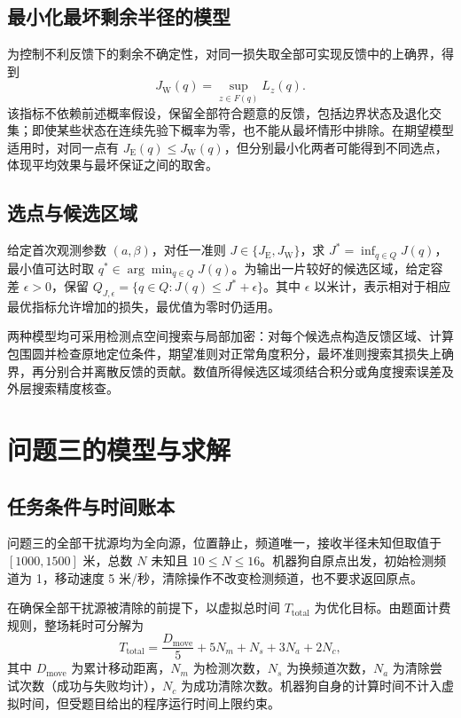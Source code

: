 \documentclass[UTF8,a4paper,zihao=-4,fontset=none]{ctexart}
\begin{document}
\subsection{最小化最坏剩余半径的模型}

为控制不利反馈下的剩余不确定性，对同一损失取全部可实现反馈中的上确界，得到
\begin{equation}
 J_{\mathrm W}(q)=\sup_{z\in F(q)}L_z(q).
\label{eq:q2-pair-worst-objective}
\end{equation}
该指标不依赖前述概率假设，保留全部符合题意的反馈，包括边界状态及退化交集；即使某些状态在连续先验下概率为零，也不能从最坏情形中排除。在期望模型适用时，对同一点有 \(J_{\mathrm E}(q)\le J_{\mathrm W}(q)\)，但分别最小化两者可能得到不同选点，体现平均效果与最坏保证之间的取舍。

\subsection{选点与候选区域}

给定首次观测参数 \((a,\beta)\)，对任一准则 \(J\in\{J_{\mathrm E},J_{\mathrm W}\}\)，求 \(J^*=\inf_{q\in Q}J(q)\)，最小值可达时取 \(q^*\in\arg\min_{q\in Q}J(q)\)。为输出一片较好的候选区域，给定容差 \(\epsilon>0\)，保留 \(Q_{J,\epsilon}=\{q\in Q:J(q)\le J^*+\epsilon\}\)。其中 \(\epsilon\) 以米计，表示相对于相应最优指标允许增加的损失，最优值为零时仍适用。

两种模型均可采用检测点空间搜索与局部加密：对每个候选点构造反馈区域、计算包围圆并检查原地定位条件，期望准则对正常角度积分，最坏准则搜索其损失上确界，再分别合并离散反馈的贡献。数值所得候选区域须结合积分或角度搜索误差及外层搜索精度核查。




\section{问题三的模型与求解}

\subsection{任务条件与时间账本}

问题三的全部干扰源均为全向源，位置静止，频道唯一，接收半径未知但取值于 \([1000,1500]\) 米，总数 \(N\) 未知且 \(10\le N\le16\)。机器狗自原点出发，初始检测频道为 1，移动速度 5 米/秒，清除操作不改变检测频道，也不要求返回原点。

在确保全部干扰源被清除的前提下，以虚拟总时间 \(T_{\mathrm{total}}\) 为优化目标。由题面计费规则，整场耗时可分解为
\begin{equation}
  T_{\mathrm{total}}=\frac{D_{\mathrm{move}}}{5}+5N_m+N_s+3N_a+2N_c,
  \label{eq:q3-ledger}
\end{equation}
其中 \(D_{\mathrm{move}}\) 为累计移动距离，\(N_m\) 为检测次数，\(N_s\) 为换频道次数，\(N_a\) 为清除尝试次数（成功与失败均计），\(N_c\) 为成功清除次数。机器狗自身的计算时间不计入虚拟时间，但受题目给出的程序运行时间上限约束。
\end{document}
